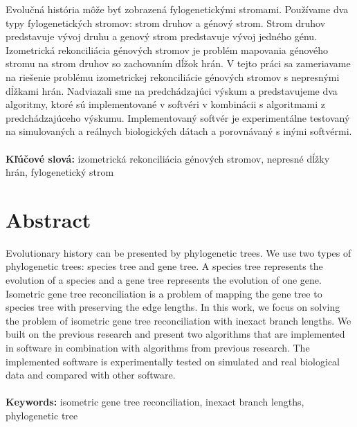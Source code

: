\documentclass[12pt,a4paper,oneside]{book}
\begin{document}
Evolučná história môže byť zobrazená fylogenetickými stromami. Používame dva typy fylogenetických stromov: strom druhov a génový strom. Strom druhov predstavuje vývoj druhu a genový strom predstavuje vývoj jedného génu. Izometrická rekonciliácia génových stromov je problém mapovania génového stromu na strom druhov so zachovaním dĺžok hrán. V tejto práci sa zameriavame na riešenie problému izometrickej rekonciliácie génových stromov s nepresnými dĺžkami hrán. Nadviazali sme na predchádzajúci výskum a predstavujeme dva algoritmy, ktoré sú implementované v softvéri v kombinácii s algoritmami z predchádzajúceho výskumu. Implementovaný softvér je experimentálne testovaný na simulovaných a reálnych biologických dátach a porovnávaný s inými softvérmi.
\\\\
\textbf{Kľúčové slová:} izometrická rekonciliácia génových stromov, nepresné dĺžky hrán, fylogenetický strom
\vfill\eject 

\chapter*{Abstract}

Evolutionary history can be presented by phylogenetic trees. We use two types of phylogenetic trees: species tree and gene tree. A species tree represents the evolution of a species and a gene tree represents the evolution of one gene. Isometric gene tree reconciliation is a problem of mapping the gene tree to species tree with preserving the edge lengths. In this work, we focus on solving the problem of isometric gene tree reconciliation with inexact branch lengths. We built on the previous research and present two algorithms that are implemented in software in combination with algorithms from previous research. The implemented software is experimentally tested on simulated and real biological data and compared with other software.
\\\\
\textbf{Keywords:} isometric gene tree reconciliation, inexact branch lengths, phylogenetic tree
\vfill\eject  

\listoffigures
\newpage

\tableofcontents
\newpage

\mainmatter


\vfill\eject







\backmatter


\vfill\eject 


\nocite{*}




\end{document}
